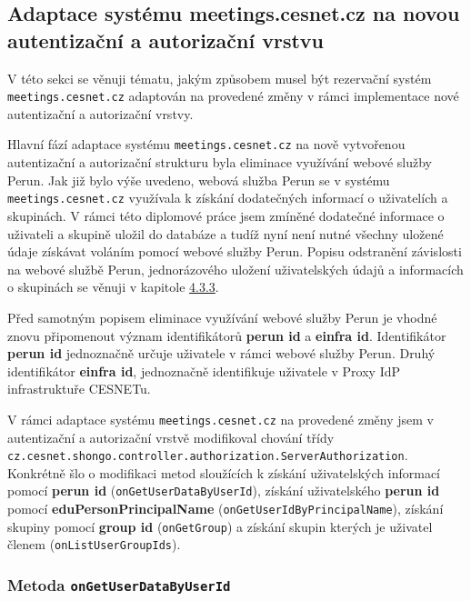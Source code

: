 \documentclass[
  printed, %
  twoside, %
  table,   %
  nolof,     %
  nolot,     %
]{fithesis3}
\begin{document}
\subsection{Adaptace systému meetings.cesnet.cz na novou autentizační a autorizační vrstvu}
\label{ShongoImpl-web}
V této sekci se věnuji tématu, jakým způsobem musel být rezervační systém \texttt{meetings.cesnet.cz} adaptován na provedené změny v rámci implementace nové autentizační a autorizační vrstvy. 
\par

Hlavní fází adaptace systému \texttt{meetings.cesnet.cz} na nově vytvořenou autentizační a autorizační strukturu byla eliminace využívání webové služby Perun. Jak již bylo výše uvedeno, webová služba Perun se v systému \texttt{meetings.cesnet.cz} využívala k získání dodatečných informací o uživatelích a skupinách. V rámci této diplomové práce jsem zmíněné dodatečné informace o uživateli a skupině uložil do databáze a tudíž nyní není nutné všechny uložené údaje získávat voláním pomocí webové služby Perun. Popisu odstranění závislosti na webové službě Perun, jednorázového uložení uživatelských údajů a informacích o skupinách se věnuji v kapitole \hyperref[zpracovaniAUlozeniPerun]{4.3.3}. 

\par
Před samotným popisem eliminace využívání webové služby Perun je vhodné znovu připomenout význam identifikátorů \textbf{perun id} a \textbf{einfra id}. Identifikátor \textbf{perun id} jednoznačně určuje uživatele v rámci webové služby Perun. Druhý identifikátor \textbf{einfra id}, jednoznačně identifikuje uživatele v Proxy IdP infrastruktuře CESNETu. 
\par V rámci adaptace systému \texttt{meetings.cesnet.cz} na provedené změny jsem v autentizační a autorizační vrstvě modifikoval chování třídy \texttt{cz.cesnet.shongo.controller.authorization.ServerAuthorization}. Konkrétně šlo o modifikaci metod sloužících k získání uživatelských informací pomocí \textbf{perun id} (\texttt{onGetUserDataByUserId}), získání uživatelského \textbf{perun id} pomocí \textbf{eduPersonPrincipalName} (\texttt{onGetUserIdByPrincipalName}), získání skupiny pomocí \textbf{group id} (\texttt{onGetGroup}) a získání skupin kterých je uživatel členem (\texttt{onListUserGroupIds}). 


\subsubsection{Metoda \texttt{onGetUserDataByUserId}}
\end{document}
